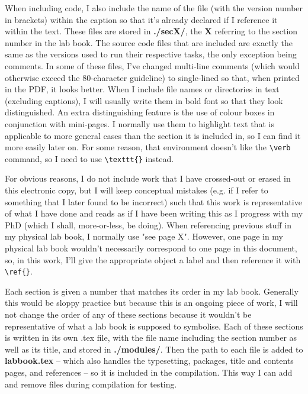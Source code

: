 When including code, I also include the name of the file (with the version number in brackets) within the caption so that it's already declared if I reference it within the text. These files are stored in \textbf{./secX/}, the \textbf{X} referring to the section number in the lab book. The source code files that are included are exactly the same as the versions used to run their respective tasks, the only exception being comments. In some of these files, I've changed multi-line comments (which would otherwise exceed the 80-character guideline) to single-lined so that, when printed in the PDF, it looks better. When I include file names or directories in text (excluding captions), I will usually write them in bold font so that they look distinguished. An extra distinguishing feature is the use of colour boxes in conjunction with mini-pages. I normally use them to highlight text that is applicable to more general cases than the section it is included in, so I can find it more easily later on. For some reason, that environment doesn't like the \verb!\verb! command, so I need to use \verb!\texttt{}! instead.

For obvious reasons, I do not include work that I have crossed-out or erased in this electronic copy, but I will keep conceptual mistakes (e.g. if I refer to something that I later found to be incorrect) such that this work is representative of what I have done and reads as if I have been writing this as I progress with my PhD (which I shall, more-or-less, be doing). When referencing previous stuff in my physical lab book, I normally use "see page X". However, one page in my physical lab book wouldn't necessarily correspond to one page in this document, so, in this work, I'll give the appropriate object a label and then reference it with \verb!\ref{}!.

Each section is given a number that matches its order in my lab book. Generally this would be sloppy practice but because this is an ongoing piece of work, I will not change the order of any of these sections because it wouldn't be representative of what a lab book is supposed to symbolise. Each of these sections is written in its own .tex file, with the file name including the section number as well as its title, and stored in \textbf{./modules/}. Then the path to each file is added to \textbf{labbook.tex} -- which also handles the typesetting, packages, title and contents pages, and references -- so it is included in the compilation. This way I can add and remove files during compilation for testing.

